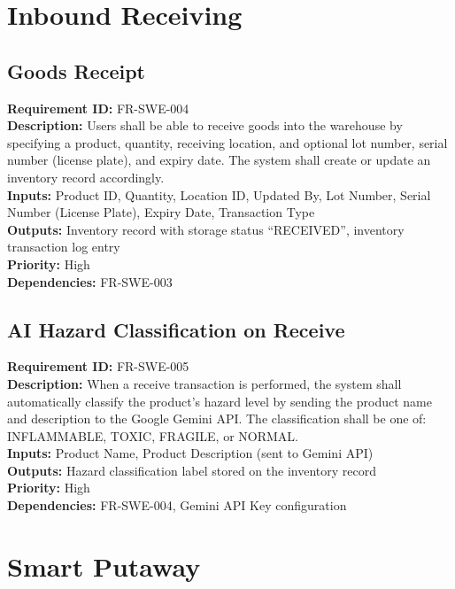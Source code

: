 \documentclass[12pt,a4paper]{report}
\begin{document}
\section{Inbound Receiving}

\subsection{Goods Receipt}
\noindent\textbf{Requirement ID:} FR-SWE-004\\
\textbf{Description:} Users shall be able to receive goods into the warehouse by specifying a product, quantity, receiving location, and optional lot number, serial number (license plate), and expiry date. The system shall create or update an inventory record accordingly.\\
\textbf{Inputs:} Product ID, Quantity, Location ID, Updated By, Lot Number, Serial Number (License Plate), Expiry Date, Transaction Type\\
\textbf{Outputs:} Inventory record with storage status ``RECEIVED'', inventory transaction log entry\\
\textbf{Priority:} High\\
\textbf{Dependencies:} FR-SWE-003

\subsection{AI Hazard Classification on Receive}
\noindent\textbf{Requirement ID:} FR-SWE-005\\
\textbf{Description:} When a receive transaction is performed, the system shall automatically classify the product's hazard level by sending the product name and description to the Google Gemini API. The classification shall be one of: INFLAMMABLE, TOXIC, FRAGILE, or NORMAL.\\
\textbf{Inputs:} Product Name, Product Description (sent to Gemini API)\\
\textbf{Outputs:} Hazard classification label stored on the inventory record\\
\textbf{Priority:} High\\
\textbf{Dependencies:} FR-SWE-004, Gemini API Key configuration

\section{Smart Putaway}
\end{document}
